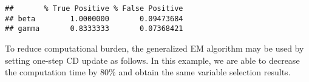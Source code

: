 \begin{Shaded}
\begin{Highlighting}[]
\StringTok{ }
\StringTok{ }
        \NormalTok{(}\NormalTok{ =}\StringTok{ }\NormalTok{(b[b0 }\OperatorTok{!=}\StringTok{ }\NormalTok{] }\OperatorTok{!=}\StringTok{ }\NormalTok{),}
          \NormalTok{ =}\StringTok{ }\NormalTok{(b[b0 }\OperatorTok{==}\StringTok{ }\NormalTok{] }\OperatorTok{!=}\StringTok{ }\NormalTok{))}
\NormalTok{    \}}
    \NormalTok{(} \NormalTok{(}\OperatorTok{$}
           \NormalTok{(}\OperatorTok{$}
\NormalTok{\}}
\end{Highlighting}
\end{Shaded}

\begin{verbatim}
##       % True Positive % False Positive
## beta        1.0000000       0.09473684
## gamma       0.8333333       0.07368421
\end{verbatim}

To reduce computational burden, the generalized EM algorithm may be used
by setting one-step CD update as follows. In this example, we are able
to decrease the computation time by 80\% and obtain the same variable
selection results.

\begin{Shaded}
\begin{Highlighting}[]
\NormalTok{(\{}
\StringTok{ }\NormalTok{(}
        \OperatorTok{$}\OperatorTok{$}
         \NormalTok{, } \NormalTok{,}
         \NormalTok{, } \NormalTok{,}
         \NormalTok{, } 
\NormalTok{    )}
\NormalTok{\})}
\end{Highlighting}
\end{Shaded}

